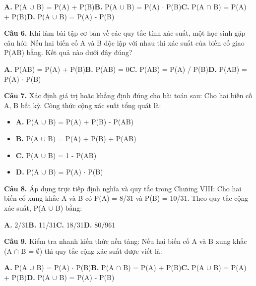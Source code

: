 \documentclass[11pt,a4paper]{article}
\begin{document}
\hspace*{1.5em}\textbf{A.} P(A $\cup$ B) = P(A) + P(B)\quad\quad \textbf{B.} P(A $\cup$ B) = P(A) $\cdot$ P(B)\quad\quad \textbf{C.} P(A $\cap$ B) = P(A) + P(B)\quad\quad \textbf{D.} P(A $\cup$ B) = P(A) - P(B)\par\vspace{2pt}
\textbf{\color{primary} Câu 6.} Khi làm bài tập cơ bản về các quy tắc tính xác suất, một học sinh gặp câu hỏi: Nếu hai biến cố A và B độc lập với nhau thì xác suất của biến cố giao P(AB) bằng. Kết quả nào dưới đây đúng?\par
\hspace*{1.5em}\textbf{A.} P(AB) = P(A) + P(B)\quad\quad \textbf{B.} P(AB) = 0\quad\quad \textbf{C.} P(AB) = P(A) / P(B)\quad\quad \textbf{D.} P(AB) = P(A) $\cdot$ P(B)\par\vspace{2pt}
\textbf{\color{primary} Câu 7.} Xác định giá trị hoặc khẳng định đúng cho bài toán sau: Cho hai biến cố A, B bất kỳ. Công thức cộng xác suất tổng quát là:\par
\begin{itemize}\setlength{\itemsep}{1pt}\setlength{\parskip}{0pt}
  \item[] \textbf{A.} P(A $\cup$ B) = P(A) + P(B) - P(AB)
  \item[] \textbf{B.} P(A $\cup$ B) = P(A) + P(B) + P(AB)
  \item[] \textbf{C.} P(A $\cup$ B) = 1 - P(AB)
  \item[] \textbf{D.} P(A $\cup$ B) = P(A) $\cdot$ P(B)
\end{itemize}\vspace{2pt}
\textbf{\color{primary} Câu 8.} Áp dụng trực tiếp định nghĩa và quy tắc trong Chương VIII: Cho hai biến cố xung khắc A và B có P(A) = 8/31 và P(B) = 10/31. Theo quy tắc cộng xác suất, P(A $\cup$ B) bằng:\par
\hspace*{1.5em}\textbf{A.} 2/31\quad\quad \textbf{B.} 11/31\quad\quad \textbf{C.} 18/31\quad\quad \textbf{D.} 80/961\par\vspace{2pt}
\textbf{\color{primary} Câu 9.} Kiểm tra nhanh kiến thức nền tảng: Nếu hai biến cố A và B xung khắc (A $\cap$ B = $\emptyset$) thì quy tắc cộng xác suất được viết là:\par
\hspace*{1.5em}\textbf{A.} P(A $\cup$ B) = P(A) $\cdot$ P(B)\quad\quad \textbf{B.} P(A $\cap$ B) = P(A) + P(B)\quad\quad \textbf{C.} P(A $\cup$ B) = P(A) + P(B)\quad\quad \textbf{D.} P(A $\cup$ B) = P(A) - P(B)\par\vspace{2pt}
\end{document}
